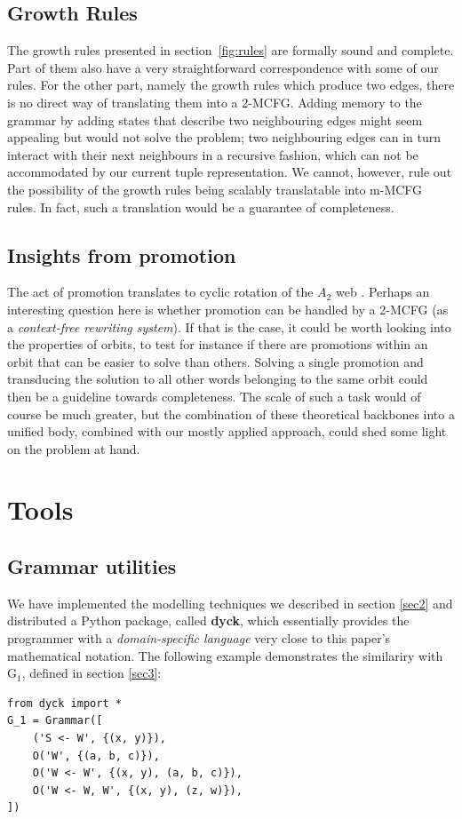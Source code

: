 \documentclass[nonatbib,numbers,10pt]{sigplanconf}
\begin{document}
\subsection{Growth Rules}
The growth rules presented in section~\ref{fig:rules} are formally sound and complete. Part of them also have a very straightforward correspondence with some of our rules. For the other part, namely the growth rules which produce two edges, there is no direct way of translating them into a 2-MCFG. Adding memory to the grammar by adding states that describe two neighbouring edges might seem appealing but would not solve the problem; two neighbouring edges can in turn interact with their next neighbours in a recursive fashion, which can not be accommodated by our current tuple representation. We cannot, however, rule out the possibility of the growth rules being scalably translatable into m-MCFG rules. In fact, such a translation would be a guarantee of completeness.
\subsection{Insights from promotion}
The act of promotion translates to cyclic rotation of the $A_2$ web \cite{petersen}. Perhaps an interesting question here is whether promotion can be handled by a 2-MCFG (as a \textit{context-free rewriting system}). If that is the case, it could be worth looking into the properties of orbits, to test for instance if there are promotions within an orbit that can be easier to solve than others. Solving a single promotion and transducing the solution to all other words belonging to the same orbit could then be a guideline towards completeness. The scale of such a task would of course be much greater, but the combination of these theoretical backbones into a unified body, combined with our mostly applied approach, could shed some light on the problem at hand.

\section{Tools}\label{tools}
\subsection{Grammar utilities}
We have implemented the modelling techniques we described in section \ref{sec2} and distributed a Python package, called \textbf{dyck}, which essentially provides the programmer with a \textit{domain-specific language} very close to this paper's mathematical notation. The following example demonstrates the similariry with G$_1$, defined in section \ref{sec3}:
\begin{verbatim}
from dyck import *
G_1 = Grammar([
    ('S <- W', {(x, y)}),
    O('W', {(a, b, c)}),
    O('W <- W', {(x, y), (a, b, c)}),
    O('W <- W, W', {(x, y), (z, w)}),
])
\end{verbatim}
\end{document}
